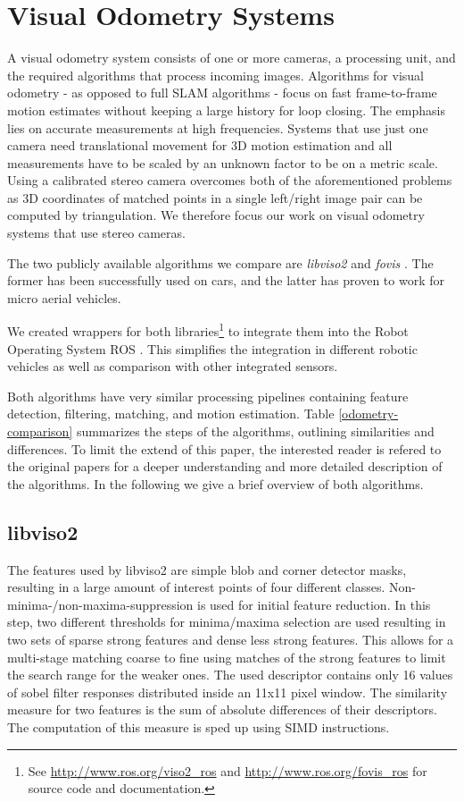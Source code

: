 \documentclass[conference]{IEEEtran}
\begin{document}
\section{Visual Odometry Systems
  \label{visual-odometry-systems}
}
A visual odometry system consists of one or more cameras, a processing unit, and the required algorithms that process incoming images.
Algorithms for visual odometry - as opposed to full SLAM algorithms - focus on fast frame-to-frame motion estimates without keeping a large history for loop closing. The emphasis lies on accurate measurements at high frequencies. Systems that use just one camera need translational movement for 3D motion estimation and all measurements have to be scaled by an unknown factor to be on a metric scale. Using a calibrated stereo camera overcomes both of the aforementioned problems as 3D coordinates of matched points in a single left/right image pair can be computed by triangulation. We therefore focus our work on visual odometry systems that use stereo cameras.

The two publicly available algorithms we compare are \emph{libviso2} \cite{Geiger2011} and \emph{fovis} \cite{Huang2011}. The former has been successfully used on cars, and the latter has proven to work for micro aerial vehicles.

We created wrappers for both libraries\footnote{See \url{http://www.ros.org/viso2_ros} and \url{http://www.ros.org/fovis_ros} for source code and documentation.} to integrate them into the Robot Operating System ROS \cite{Quigley2009}. This simplifies the integration in different robotic vehicles as well as comparison with other integrated sensors.


Both algorithms have very similar processing pipelines containing feature detection, filtering, matching, and motion estimation. Table \ref{odometry-comparison} summarizes the steps of the algorithms, outlining similarities and differences. To limit the extend of this paper, the interested reader is refered to the original papers for a deeper understanding and more detailed description of the algorithms. In the following we give a brief overview of both algorithms.

\subsection{libviso2
  \label{libviso2}
}

The features used by libviso2 are simple blob and corner detector masks, resulting in a large amount of interest points of four different classes. Non-minima-/non-maxima-suppression is used for initial feature reduction. In this step, two different thresholds for minima/maxima selection are used resulting in two sets of sparse strong features and dense less strong features. This allows for a multi-stage matching coarse to fine using matches of the strong features to limit the search range for the weaker ones. The used descriptor contains only 16 values of sobel filter responses distributed inside an 11x11 pixel window. The similarity measure for two features is the sum of absolute differences of their descriptors. The computation of this measure is sped up using SIMD instructions.
\end{document}
